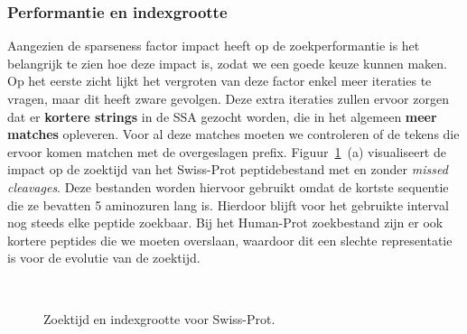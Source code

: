 \subsubsection{Performantie en indexgrootte}
Aangezien de sparseness factor impact heeft op de zoekperformantie is het belangrijk te zien hoe deze impact is, zodat we een goede keuze kunnen maken.
Op het eerste zicht lijkt het vergroten van deze factor enkel meer iteraties te vragen, maar dit heeft zware gevolgen.
Deze extra iteraties zullen ervoor zorgen dat er \textbf{kortere strings} in de SSA gezocht worden, die in het algemeen \textbf{meer matches} opleveren.
Voor al deze matches moeten we controleren of de tekens die ervoor komen matchen met de overgeslagen prefix.
Figuur~\ref{fig:search_sparseness}~(a) visualiseert de impact op de zoektijd van het Swiss-Prot peptidebestand met en zonder \textit{missed cleavages}.
Deze bestanden worden hiervoor gebruikt omdat de kortste sequentie die ze bevatten 5 aminozuren lang is.
Hierdoor blijft voor het gebruikte interval nog steeds elke peptide zoekbaar.
Bij het Human-Prot zoekbestand zijn er ook kortere peptides die we moeten overslaan, waardoor dit een slechte representatie is voor de evolutie van de zoektijd.
\\
\begin{figure}[H]
    \centering
    \\[4ex] %

    \caption{Zoektijd en indexgrootte voor Swiss-Prot.}\label{fig:search_sparseness}
\end{figure}

